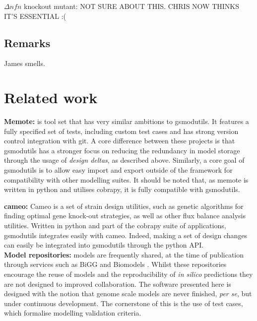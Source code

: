 \documentclass[a4paper,10pt]{article}
\begin{document}
$\Delta \textit{nfn}$ knockout mutant: NOT SURE ABOUT THIS. CHRIS NOW THINKS IT'S ESSENTIAL :(

\subsection{Remarks}

James smells.
 
\section{Related work}
\textbf{Memote:} \cite{lieven2017memote} is tool set that has very similar ambitions to gsmodutils.
It features a fully specified set of tests, including custom test cases and has strong version control integration with git.
A core difference between these projects is that gsmodutils has a stronger focus on reducing the redundancy in model storage through the usage of \textit{design deltas}, as described above.
Similarly, a core goal of gsmodutils is to allow easy import and export outside of the framework for compatibility with other modelling suites.
It should be noted that, as memote is written in python and utilises cobrapy, it is fully compatible with gsmodutils.

\textbf{cameo:} Cameo \cite{cardoso2017cameo} is a set of strain design utilities, such as genetic algorithms for finding optimal gene knock-out
strategies, as well as other flux balance analysis utilities. Written in python and part of the cobrapy suite of applications,
gsmodutils integrates easily with cameo.
Indeed, making a set of design changes can easily be integrated into gsmodutils through the python API.
\\
\textbf{Model repositories:} models are frequently shared, at the time of publication through services such as BiGG \cite{king2015bigg} and Biomodels \cite{chelliah2013biomodels}. 
Whilst these repositories encourage the reuse of models and the reproducibility of \textit{in silico} predictions they are not designed to improved collaboration.
The software presented here is designed with the notion that genome scale models are never finished, \textit{per se}, but under continuous development.
The cornerstone of this is the use of test cases, which formalise modelling validation criteria.
\end{document}
